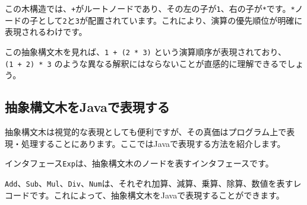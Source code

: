 この木構造では、\texttt{+}がルートノードであり、その左の子が\texttt{1}、右の子が\texttt{*}です。\texttt{*}ノードの子として\texttt{2}と\texttt{3}が配置されています。これにより、演算の優先順位が明確に表現されるわけです。

この抽象構文木を見れば、\texttt{1\ +\ (2\ *\ 3)}
という演算順序が表現されており、\texttt{(1\ +\ 2)\ *\ 3}
のような異なる解釈にはならないことが直感的に理解できるでしょう。

\hypertarget{chapter2-ux62bdux8c61ux69cbux6587ux6728ux3092javaux3067ux8868ux73feux3059ux308b}{%
\subsection{抽象構文木をJavaで表現する}\label{chapter2-ux62bdux8c61ux69cbux6587ux6728ux3092javaux3067ux8868ux73feux3059ux308b}}

抽象構文木は視覚的な表現としても便利ですが、その真価はプログラム上で表現・処理することにあります。ここではJavaで表現する方法を紹介します。

\begin{Shaded}
\begin{Highlighting}[]
\NormalTok{(}
\end{Highlighting}
\end{Shaded}

インタフェース\texttt{Exp}は、抽象構文木のノードを表すインタフェースです。

\texttt{Add}、\texttt{Sub}、\texttt{Mul}、\texttt{Div}、\texttt{Num}は、それぞれ加算、減算、乗算、除算、数値を表すレコードです。これによって、抽象構文木をJavaで表現することができます。

